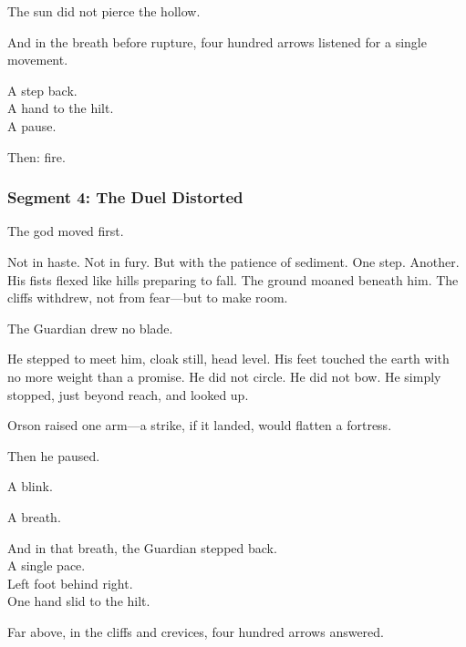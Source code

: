 \documentclass[9pt]{article}
\begin{document}
\vspace{0.5em}
The sun did not pierce the hollow.

\vspace{0.5em}
And in the breath before rupture, four hundred arrows listened for a single movement.

\vspace{0.5em}
A step back.\\
A hand to the hilt.\\
A pause.

\vspace{0.5em}
Then: fire.


\newpage

\subsubsection*{Segment 4: The Duel Distorted}

The god moved first.

\vspace{0.5em}
Not in haste. Not in fury. But with the patience of sediment. One step. Another. His fists flexed like hills preparing to fall. The ground moaned beneath him. The cliffs withdrew, not from fear---but to make room.

\vspace{0.5em}
The Guardian drew no blade.

\vspace{0.5em}
He stepped to meet him, cloak still, head level. His feet touched the earth with no more weight than a promise. He did not circle. He did not bow. He simply stopped, just beyond reach, and looked up.

\vspace{0.5em}
Orson raised one arm---a strike, if it landed, would flatten a fortress.

\vspace{0.5em}
Then he paused.

\vspace{0.5em}
A blink.

\vspace{0.5em}
A breath.

\vspace{0.5em}
And in that breath, the Guardian stepped back.\\
A single pace.\\
Left foot behind right.\\
One hand slid to the hilt.

\vspace{0.5em}
Far above, in the cliffs and crevices, four hundred arrows answered.
\end{document}
